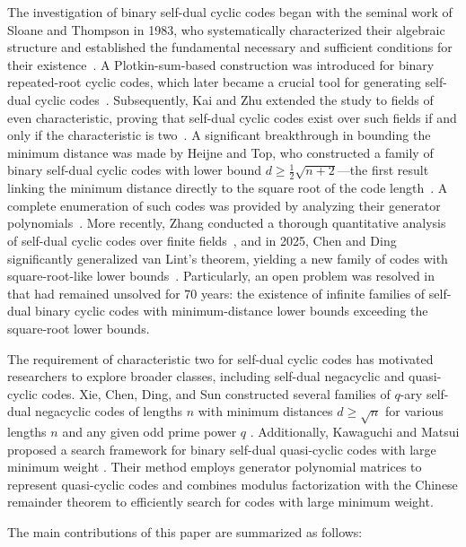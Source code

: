 \documentclass[journal,12pt,onecolumn]{IEEEtran}
\begin{document}
The investigation of binary self-dual cyclic codes began with the seminal work of Sloane and Thompson in 1983, who systematically characterized their algebraic structure and established the fundamental necessary and sufficient conditions for their existence~\cite{1056682}. A Plotkin-sum-based construction was introduced for binary repeated-root cyclic codes, which later became a crucial tool for generating self-dual cyclic codes~\cite{75250}. Subsequently, Kai and Zhu extended the study to fields of even characteristic, proving that self-dual cyclic codes exist over such fields if and only if the characteristic is two~\cite{2008On}. A significant breakthrough in bounding the minimum distance was made by Heijne and Top, who constructed a family of binary self-dual cyclic codes with lower bound $d \ge \frac{1}{2}\sqrt{n+2}$---the first result linking the minimum distance directly to the square root of the code length~\cite{5290289}.  A complete enumeration of such codes was provided by analyzing their generator polynomials~\cite{5730592}. More recently, Zhang conducted a thorough quantitative analysis of self-dual cyclic codes over finite fields~\cite{2024The}, and in 2025, Chen and Ding significantly generalized van Lint's theorem, yielding a new family of codes with square-root-like lower bounds~\cite{10856234}. Particularly, an open problem was resolved in~~\cite{wang2026constructionsselfdualbinarycyclic} that had remained unsolved for 70 years: the existence of infinite families of self-dual binary cyclic codes with minimum-distance lower bounds exceeding the square-root lower bounds.

The requirement of characteristic two for self-dual cyclic codes has motivated researchers to explore broader classes, including self-dual negacyclic and quasi-cyclic codes. Xie, Chen, Ding, and Sun  constructed several families of $q$-ary self-dual negacyclic codes of lengths $n$ with minimum distances $d \ge \sqrt{n}$ for various lengths $n$ and any given odd prime power $q$ \cite{10478023}. Additionally, Kawaguchi and Matsui proposed a search framework for binary self-dual quasi-cyclic codes with large minimum weight \cite{9366205}. Their method employs generator polynomial matrices to represent quasi-cyclic codes and combines modulus factorization with the Chinese remainder theorem to efficiently search for codes with large minimum weight.

The main contributions of this paper are summarized as follows:
\end{document}
